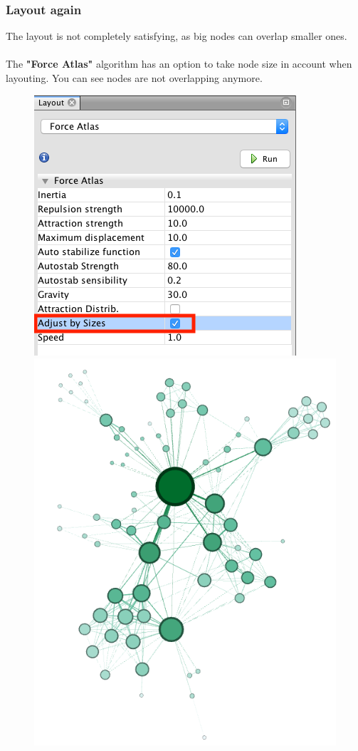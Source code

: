 \documentclass[10pt]{beamer}
\begin{document}
\begin{frame}
\frametitle{Layout again}
The layout is not completely satisfying, as big nodes can overlap smaller ones. \\~\\

The \textbf{"Force Atlas"} algorithm has an option to take node size in account when layouting. You can see nodes are not overlapping anymore.

\begin{figure}
\centering
\begin{minipage}{.45\textwidth}
\centering
\includegraphics[width=0.8\linewidth]{figures/adjust_by_size.png}
\end{minipage}
\begin{minipage}{.45\textwidth}
\centering
\includegraphics[width=0.8\linewidth]{figures/network_adjusted_by_size.png}
\end{minipage}
\end{figure}
\end{frame}
\end{document}
